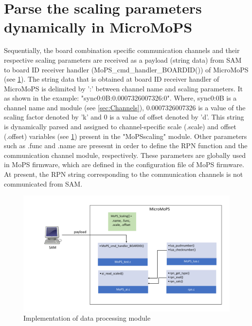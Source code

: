 \section{Parse the scaling parameters dynamically in MicroMoPS}\label{sec:parse}
	Sequentially, the board combination specific communication channels and their respective scaling parameters are received as a payload (string data) from \gls{SAM} to board ID receiver handler (MoPS\_cmd\_handler\_BOARDID()) of MicroMoPS (see \cref{fig:DP}). 
	The string data that is obtained at board ID receiver handler of MicroMoPS is delimited by ':' between channel name and scaling parameters. It as shown in the example: "sync0:0B:0.0007326007326:0". 
	Where, sync0:0B is a channel name and module (see \cref{sec:Channels}), 0.0007326007326 is a value of the scaling factor denoted by 'k' and 0 is a value of offset denoted by 'd'. 
	This string is dynamically parsed and assigned to channel-specific scale (.scale) and offset (.offset) variables (see \cref{fig:DP}) present in the "MoPSscaling" module.
	Other parameters such as .func and .name are presesnt in order to define the RPN function and the communication channel module, respectively. These parameters are globally used in MoPS firmware, which are defined in the configuration file of MoPS firmware.   
	At present, the RPN string corresponding to the communication channels is not communicated from SAM.	  

\begin{figure}[hbt]
		\centering
		\includegraphics[trim=50 30 0 0, clip, width=152mm, scale=1]{images/Scaling_implementation.pdf}
		\caption{Implementation of data processing module}
		\label{fig:DP}
\end{figure}

